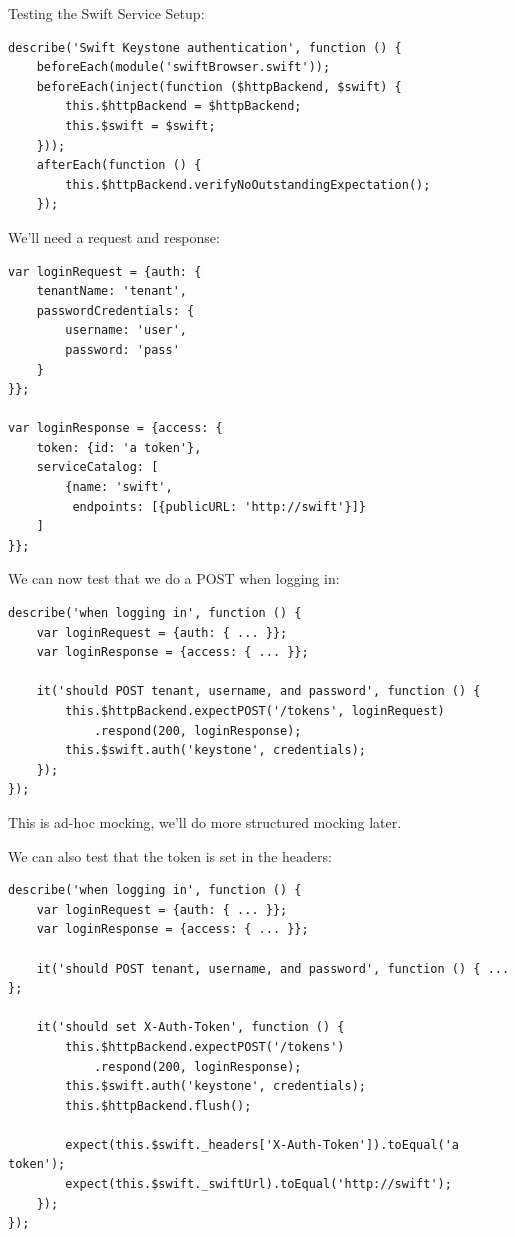 \documentclass[t,noamsthm]{beamer}
\begin{document}
\begin{frame}{Testing the Swift Service}
Setup:
\begin{lstlisting}
describe('Swift Keystone authentication', function () {
    beforeEach(module('swiftBrowser.swift'));
    beforeEach(inject(function ($httpBackend, $swift) {
        this.$httpBackend = $httpBackend;
        this.$swift = $swift;
    }));
    afterEach(function () {
        this.$httpBackend.verifyNoOutstandingExpectation();
    });
\end{lstlisting}
\framebreak

We'll need a request and response:
\begin{lstlisting}
var loginRequest = {auth: {
    tenantName: 'tenant',
    passwordCredentials: {
        username: 'user',
        password: 'pass'
    }
}};

var loginResponse = {access: {
    token: {id: 'a token'},
    serviceCatalog: [
        {name: 'swift',
         endpoints: [{publicURL: 'http://swift'}]}
    ]
}};
\end{lstlisting}

\framebreak

We can now test that we do a POST when logging in:
\begin{lstlisting}
describe('when logging in', function () {
    var loginRequest = {auth: { ... }};
    var loginResponse = {access: { ... }};

    it('should POST tenant, username, and password', function () {
        this.$httpBackend.expectPOST('/tokens', loginRequest)
            .respond(200, loginResponse);
        this.$swift.auth('keystone', credentials);
    });
});
\end{lstlisting}

This is ad-hoc mocking, we'll do more structured mocking later.


\framebreak

We can also test that the token is set in the headers:
\begin{lstlisting}
describe('when logging in', function () {
    var loginRequest = {auth: { ... }};
    var loginResponse = {access: { ... }};

    it('should POST tenant, username, and password', function () { ... };

    it('should set X-Auth-Token', function () {
        this.$httpBackend.expectPOST('/tokens')
            .respond(200, loginResponse);
        this.$swift.auth('keystone', credentials);
        this.$httpBackend.flush();

        expect(this.$swift._headers['X-Auth-Token']).toEqual('a token');
        expect(this.$swift._swiftUrl).toEqual('http://swift');
    });
});
\end{lstlisting}    
\end{frame}
\end{document}

